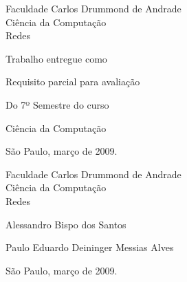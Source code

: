 
\thispagestyle{empty}

\begin{center}

 {\huge Faculdade Carlos Drummond de Andrade \\

 Ciência da Computação \\ [30mm]

 Redes} \\ [75mm]

\end{center}

\hspace{8cm} Trabalho entregue como 

\hspace{8cm} Requisito parcial para avaliação 

\hspace{8cm} Do 7º Semestre do curso 

\hspace{8cm} Ciência da Computação

\begin{center}
 \vfill São Paulo, março de 2009.
\end{center}

\newpage

\thispagestyle{empty}

\begin{center}

 {\huge Faculdade Carlos Drummond de Andrade \\

 Ciência da Computação \\ [30mm]

  Redes} \\ [75mm]

\end{center}

\hspace{8cm} Alessandro Bispo dos Santos

\hspace{8cm} Paulo Eduardo Deininger Messias Alves

\begin{center}
 \vfill São Paulo, março de 2009.
\end{center}





